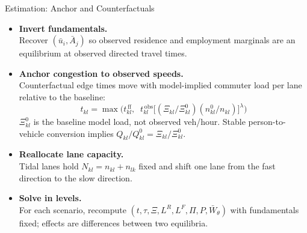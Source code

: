 \documentclass[11pt,aspectratio=169]{beamer}
\newcommand{\app}[1]{\allowbreak\hspace{0.25em}\hyperlink{#1}{\beamergotobutton{details}}}
\begin{document}
\begin{frame}{Estimation: Anchor and Counterfactuals}
\begin{itemize}\small
  \item \textbf{Invert fundamentals.}\\[-0.1em]
  {\footnotesize Recover $(\bar u_i,\bar A_j)$ so observed residence and employment marginals are an equilibrium at observed directed travel times.}
  \item \textbf{Anchor congestion to observed speeds.}\\[-0.1em]
  {\footnotesize Counterfactual edge times move with model-implied commuter load per lane relative to the baseline:}
  \vspace{-0.35em}\begin{equation}\label{eq:anchor}
    t_{kl}=\max\!\Big( t_{kl}^{\,\mathrm{ff}},\;\;
    t_{kl}^{\,\mathrm{obs}}\big[(\Xi_{kl}/\Xi_{kl}^{0})(n_{kl}^{0}/n_{kl})\big]^{\lambda}\Big)
  \end{equation}
  {\scriptsize $\Xi_{kl}^{0}$ is the baseline model load, not observed veh/hour. Stable person-to-vehicle conversion implies $Q_{kl}/Q_{kl}^{0}=\Xi_{kl}/\Xi_{kl}^{0}$. \app{appflowbridge}}
  \item \textbf{Reallocate lane capacity.}\\[-0.1em]
  {\footnotesize Tidal lanes hold $N_{kl}=n_{kl}+n_{lk}$ fixed and shift one lane from the fast direction to the slow direction.}
  \item \textbf{Solve in levels.}\\[-0.1em]
  {\footnotesize For each scenario, recompute $(t,\tau,\Xi,L^R,L^F,\Pi,P,\bar W_\theta)$ with fundamentals fixed; effects are differences between two equilibria.}
\end{itemize}
\end{frame}
\end{document}
